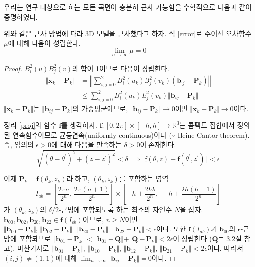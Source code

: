 \documentclass{Humantech_Paper_Awardfullpaper_hutech}
\begin{document}
우리는 연구 대상으로 하는 모든 곡면이 충분히 근사 가능함을 수학적으로 다음과 같이 증명하였다.
\begin{thm} \label{thm}
	위와 같은 근사 방법에 따라 3D 모델을 근사했다고 하자. 식 \eqref{error}로 주어진 오차함수 $\mu$에 대해 다음이 성립한다.
	\begin{equation*}
		\lim_{n\to\infty}\mu=0
	\end{equation*}
\end{thm} 
\begin{proof}
	$B_i^2(u) B_j^2(v)$의 합이 1이므로 다음이 성립한다.
	\begin{align*}
		\Vert \mathbf{x}_k - \mathbf{P}_k \Vert &= \left\Vert \sum_{i, j = 0}^2 B_i^2(u_k) B_j^2(v_k) (\mathbf{b}_{ij} - \mathbf{P}_k) \right\Vert \\
		&\leq \sum_{i, j = 0}^2 B_i^2(u_k) B_j^2(v_k) \Vert \mathbf{b}_{ij} - \mathbf{P}_k \Vert 
	\end{align*}
	$\Vert \mathbf{x}_k - \mathbf{P}_k \Vert$는 $\Vert \mathbf{b}_{ij} - \mathbf{P}_k \Vert$의 가중평균이므로, $\Vert \mathbf{b}_{ij} - \mathbf{P}_k \Vert \to 0$이면 $\Vert \mathbf{x}_k - \mathbf{P}_k \Vert \to 0$이다. 
	
	정리 \ref{proj}의 함수 $\mathbf{f}$를 생각하자. $\mathbf{f} \colon [0, 2\pi] \times [-h, h] \to \mathbb{R}^3$는 콤팩트 집합에서 정의된 연속함수이므로 균등연속(uniformly continuous)이다 ($\because$ Heine-Cantor theorem). 즉, 임의의 $\epsilon > 0$에 대해 다음을 만족하는 $\delta > 0$이 존재한다. 
	$$ \sqrt{(\theta - \theta^\prime)^2 + (z - z^\prime)^2} < \delta \implies \Vert \mathbf{f}(\theta, z) - \mathbf{f}(\theta^\prime, z^\prime) \Vert < \epsilon $$
	
	이제 $\mathbf{P}_k = \mathbf{f}(\theta_k, z_k)$라 하고, $(\theta_k, z_k)$를 포함하는 영역 $$ I_{ab} = \left[ \frac{2\pi a}{2^n}, \, \frac{2\pi(a+1)}{2^n}\right] \times \left[ -h + \frac{2hb}{2^n}, \, -h + \frac{2h(b+1)}{2^n} \right] $$가 $(\theta_k, z_k)$의 $\delta/2$-근방에 포함되도록 하는 최소의 자연수 $N$을 잡자. $\mathbf{b}_{00}, \mathbf{b}_{02}, \mathbf{b}_{20}, \mathbf{b}_{22} \in \mathbf{f}(I_{ab})$이므로, $n \geq N$이면 $\Vert \mathbf{b}_{00} - \mathbf{P}_k \Vert, \, \Vert \mathbf{b}_{02} - \mathbf{P}_k \Vert, \, \Vert \mathbf{b}_{20} - \mathbf{P}_k \Vert, \, \Vert \mathbf{b}_{22} - \mathbf{P}_k \Vert < \epsilon$이다. 또한 $\mathbf{f}(I_{ab})$가 $\mathbf{b}_{00}$의 $\epsilon$-근방에 포함되므로 $\Vert \mathbf{b}_{01} - \mathbf{P}_k \Vert < \Vert \mathbf{b}_{01} - \mathbf{Q} \Vert + \Vert \mathbf{Q} - \mathbf{P}_k \Vert < 2\epsilon$이 성립한다 ($\mathbf{Q}$는 3.2절 참고). 마찬가지로 $\Vert \mathbf{b}_{01} - \mathbf{P}_k \Vert, \, \Vert \mathbf{b}_{10} - \mathbf{P}_k \Vert, \, \Vert \mathbf{b}_{12} - \mathbf{P}_k \Vert, \, \Vert \mathbf{b}_{21} - \mathbf{P}_k \Vert < 2\epsilon$이다. 따라서 $(i, j) \neq (1, 1)$에 대해 $\lim_{n \to \infty} \Vert \mathbf{b}_{ij} - \mathbf{P}_k \Vert = 0$이다. 
	

\end{proof}
\end{document}
